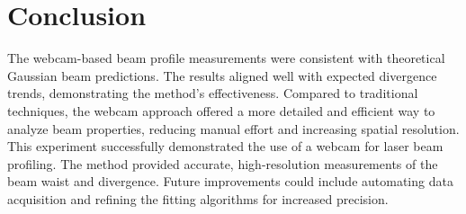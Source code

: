 \documentclass[12pt]{article}
\begin{document}
\section{Conclusion}
The webcam-based beam profile measurements were consistent with theoretical Gaussian beam predictions. The results aligned well with expected divergence trends, demonstrating the method’s effectiveness. Compared to traditional techniques, the webcam approach offered a more detailed and efficient way to analyze beam properties, reducing manual effort and increasing spatial resolution. This experiment successfully demonstrated the use of a webcam for laser beam profiling. The method provided accurate, high-resolution measurements of the beam waist and divergence. Future improvements could include automating data acquisition and refining the fitting algorithms for increased precision.
\end{document}
